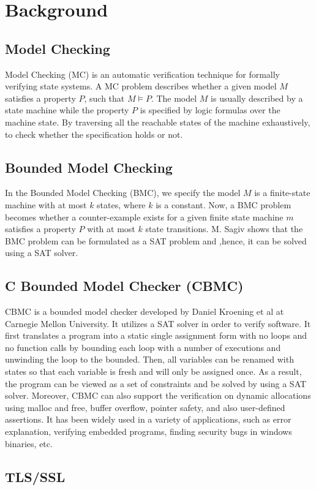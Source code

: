 \chapter{Background}
\section{Model Checking}
Model Checking (MC) is an automatic verification technique for formally verifying state systems. A MC problem describes whether a given model $M$ satisfies a property $P$, such that $M \models P$. The model $M$ is usually described by a state machine while the property $P$ is specified by logic formulas over the machine state. By traversing all the reachable states of the machine exhaustively, to check whether the specification holds or not.

\section{Bounded Model Checking}
In the Bounded Model Checking (BMC), we specify the model $M$ is a finite-state machine with at most $k$ states, where $k$ is a constant. Now, a BMC problem becomes whether a counter-example exists for a given finite state machine $m$ satisfies a property $P$ with at most $k$ state transitions. M. Sagiv \cite{1_sagiv_2015} shows that the BMC problem can be formulated as a SAT problem and ,hence, it can be solved using a SAT solver.

\section{C Bounded Model Checker (CBMC)}
CBMC \cite{the_cprover_user_manual} \cite{ckl2004} is a bounded model checker developed by Daniel Kroening et al at Carnegie Mellon University. It utilizes a SAT solver in order to verify software. It first translates a program into a static single assignment form with no loops and no function calls by bounding each loop with a number of executions and unwinding the loop to the bounded. Then, all variables can be renamed with states so that each variable is fresh and will only be assigned once. As a result, the program can be viewed as a set of constraints and be solved by using a SAT solver. Moreover, CBMC can also support the verification on dynamic allocations using malloc and free, buffer overflow, pointer safety, and also user-defined assertions. It has been widely used in a variety of applications, such as error explanation, verifying embedded programs, finding security bugs in windows binaries, etc.

\section{TLS/SSL}
